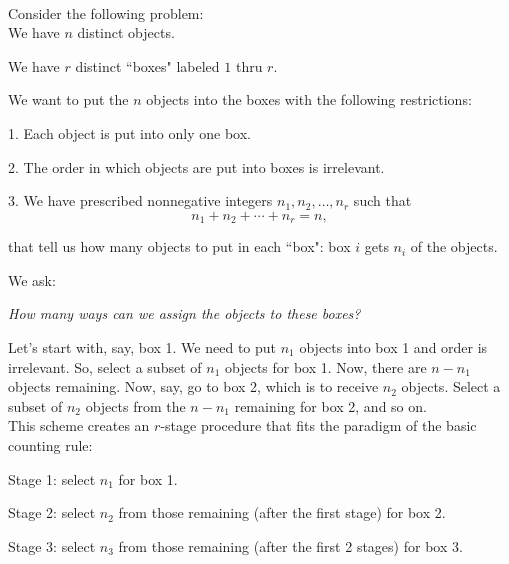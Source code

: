 \documentclass[12pt]{article}
\begin{document}


%
%
%

\newpage


\label{multinomialcoeff1}\\

\noindent Consider the following problem:\\

\noindent We have $n$ distinct objects.

\noindent We have $r$ distinct ``boxes" labeled $1$ thru $r$.

\noindent We want to put the $n$ objects into the boxes with the following restrictions:

1. Each object is put into only one box.

2. The order in which objects are put into boxes is irrelevant.

3. We have prescribed nonnegative integers $n_1,n_2,\dots,n_r$ such that
$$n_1+n_2+\cdots+n_r=n,$$

that tell us how many objects to put in each ``box": box $i$ gets $n_i$ of the objects.

\noindent We ask:

\begin{center}{\em How many ways can we assign the objects to these boxes?}\end{center}

\noindent Let's start with, say, box 1.
We need to put $n_1$ objects into box 1 and order is irrelevant.
So, select a subset of $n_1$ objects for box 1.
Now, there are $n-n_1$ objects remaining.
Now, say, go to box 2, which is to
receive $n_2$ objects.
Select a subset of $n_2$ objects from the $n-n_1$ remaining for box 2, and so on.\\

\noindent This scheme creates an $r$-stage procedure that fits the paradigm of the basic counting rule:

Stage 1: select $n_1$ for box 1.

Stage 2: select $n_2$ from those remaining (after the first stage) for box 2.

Stage 3: select $n_3$ from those remaining (after the first 2 stages) for box 3.
\end{document}
